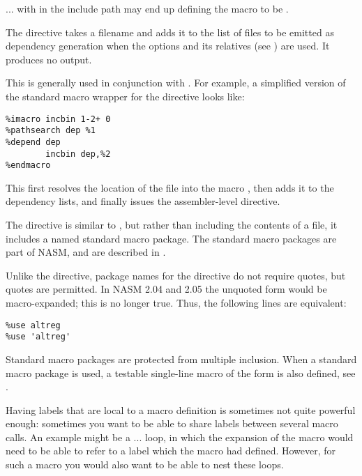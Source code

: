 ... with  in the include path may end up defining the macro
 to be .


The  directive takes a filename and adds it to the list of
files to be emitted as dependency generation when the  options
and its relatives (see ) are used. It produces
no output.

This is generally used in conjunction with . For
example, a simplified version of the standard macro wrapper for the
 directive looks like:

\begin{lstlisting}
%imacro incbin 1-2+ 0
%pathsearch dep %1
%depend dep
        incbin dep,%2
%endmacro
\end{lstlisting}

This first resolves the location of the file into the macro ,
then adds it to the dependency lists, and finally issues the
assembler-level  directive.


The  directive is similar to , but rather than
including the contents of a file, it includes a named standard macro
package.  The standard macro packages are part of NASM, and are
described in .

Unlike the  directive, package names for the 
directive do not require quotes, but quotes are permitted. In NASM
2.04 and 2.05 the unquoted form would be macro-expanded; this is no
longer true. Thus, the following lines are equivalent:

\begin{lstlisting}
%use altreg
%use 'altreg'
\end{lstlisting}

Standard macro packages are protected from multiple inclusion. When a
standard macro package is used, a testable single-line macro of the
form  is also defined,
see .


Having labels that are local to a macro definition is sometimes not
quite powerful enough: sometimes you want to be able to share labels
between several macro calls. An example might be a  ...
 loop, in which the expansion of the  macro
would need to be able to refer to a label which the  macro
had defined. However, for such a macro you would also want to be
able to nest these loops.

